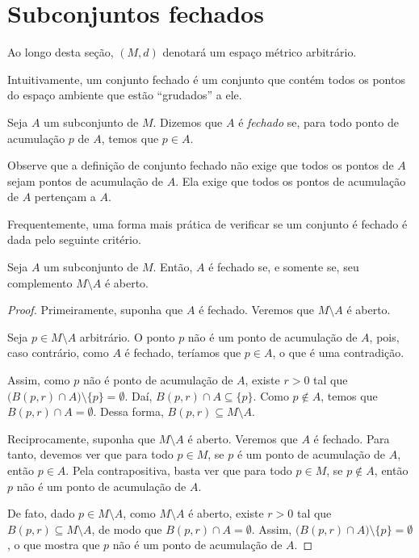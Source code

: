 
\section{Subconjuntos fechados}
Ao longo desta seção, $(M,d)$ denotará um espaço métrico arbitrário.

Intuitivamente, um conjunto fechado é um conjunto que contém todos os pontos do espaço ambiente que estão ``grudados'' a ele.

\begin{definition}
    Seja $A$ um subconjunto de $M$.
    Dizemos que $A$ é \emph{fechado} se, para todo ponto de acumulação $p$ de $A$, temos que $p \in A$.
\end{definition}

Observe que a definição de conjunto fechado não exige que todos os pontos de $A$ sejam pontos de acumulação de $A$.
Ela exige que todos os pontos de acumulação de $A$ pertençam a $A$.

Frequentemente, uma forma mais prática de verificar se um conjunto é fechado é dada pelo seguinte critério.
\begin{proposition}\label{prop:fechado-complemento-aberto}
    Seja $A$ um subconjunto de $M$.
    Então, $A$ é fechado se, e somente se, seu complemento $M\setminus A$ é aberto.
\end{proposition}

\begin{proof}
    Primeiramente, suponha que $A$ é fechado.
    Veremos que $M\setminus A$ é aberto.

    Seja $p \in M\setminus A$ arbitrário.
    O ponto $p$ não é um ponto de acumulação de $A$, pois, caso contrário, como $A$ é fechado, teríamos que $p \in A$, o que é uma contradição.

    Assim, como $p$ não é ponto de acumulação de $A$, existe $r>0$ tal que $\bigl(B(p, r)\cap A\bigr)\setminus\{p\} = \emptyset$.
    Daí, $B(p, r)\cap A\subseteq \{p\}$.
    Como $p \notin A$, temos que $B(p, r)\cap A = \emptyset$.
    Dessa forma, $B(p, r)\subseteq M\setminus A$.

    Reciprocamente, suponha que $M\setminus A$ é aberto.
    Veremos que $A$ é fechado.
    Para tanto, devemos ver que para todo $p\in M$, se $p$ é um ponto de acumulação de $A$, então $p \in A$.
    Pela contrapositiva, basta ver que para todo $p\in M$, se $p \notin A$, então $p$ não é um ponto de acumulação de $A$.

    De fato, dado $p \in M\setminus A$, como $M\setminus A$ é aberto, existe $r>0$ tal que $B(p, r)\subseteq M\setminus A$, de modo que $B(p, r)\cap A = \emptyset$.
    Assim, $\bigl(B(p, r)\cap A\bigr)\setminus\{p\} = \emptyset$, o que mostra que $p$ não é um ponto de acumulação de $A$.
\end{proof}

